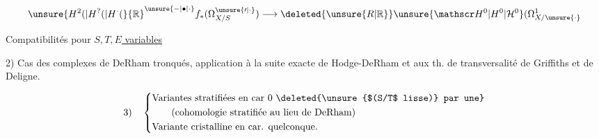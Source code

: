 
\[
\unsure{H^2(|H^?(|H^{\cdot}(}{\mathbb R}^{\unsure{-|\bullet|\cdot}}f_*(\Omega^{\unsure{\prime|\cdot}}_{X/S})\longrightarrow\deleted{\unsure{R|\mathbb R}}\unsure{\mathscr H^0|H^0|\mathcal H^0}(\Omega^1_{X/\unsure{\cdot}}
\]


  Compatibilités pour \uline{$S,T,E$ variables} 

2) Cas des complexes de DeRham tronqués, application à la suite exacte de Hodge-DeRham et aux th. de transversalité de Griffiths et de Deligne.

\[
3)\quad\left\{\begin{aligned}
&\text{Variantes stratifiées en car 0 \deleted{\unsure{$(S/T$ lisse)} par une}}\\
&\qquad\text{(cohomologie stratifiée au lieu de DeRham)}\\
&\text{Variante cristalline en car. quelconque.}
\end{aligned}\right.
\]

